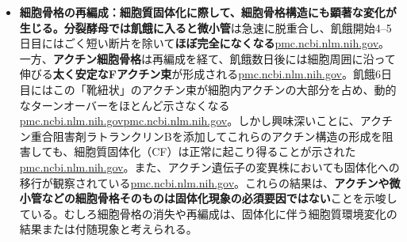 \begin{itemize}
    \item \textbf{細胞骨格の再編成：\textbf{細胞質固体化に際して、細胞骨格構造にも顕著な変化が生じる。分裂酵母では飢餓に入ると}微小管}は急速に脱重合し、飢餓開始4–5日目にはごく短い断片を除いて\textbf{ほぼ完全になくなる}\href{https://pmc.ncbi.nlm.nih.gov/articles/PMC6857596/\#:~:text=Microtubules\%20can\%20be\%20virtually\%20excluded\%2C,confirmed\%20this\%20result\%20by\%20imaging}{pmc.ncbi.nlm.nih.gov}。一方、\textbf{アクチン細胞骨格}は再編成を経て、飢餓数日後には細胞周囲に沿って伸びる\textbf{太く安定なFアクチン束}が形成される\href{https://pmc.ncbi.nlm.nih.gov/articles/PMC6857596/\#:~:text=curled\%20around\%20the\%20cell\%20ends,circumference\%2C\%20while\%20curling\%20around\%20both}{pmc.ncbi.nlm.nih.gov}。飢餓6日目にはこの「靴紐状」のアクチン束が細胞内アクチンの大部分を占め、動的なターンオーバーをほとんど示さなくなる\href{https://pmc.ncbi.nlm.nih.gov/articles/PMC6857596/\#:~:text=curled\%20around\%20the\%20cell\%20ends,circumference\%2C\%20while\%20curling\%20around\%20both}{pmc.ncbi.nlm.nih.gov}\href{https://pmc.ncbi.nlm.nih.gov/articles/PMC6857596/\#:~:text=SD6\%20did\%20not\%20affect\%20the,on\%20SD3\%29\%20and}{pmc.ncbi.nlm.nih.gov}。しかし興味深いことに、アクチン重合阻害剤ラトランクリンBを添加してこれらのアクチン構造の形成を阻害しても、細胞質固体化（CF）は正常に起こり得ることが示された\href{https://pmc.ncbi.nlm.nih.gov/articles/PMC6857596/\#:~:text=and\%20Methods\%29,experiment\%2C\%20LatB\%20significantly\%20interferes\%20with}{pmc.ncbi.nlm.nih.gov}。また、アクチン遺伝子の変異株においても固体化への移行が観察されている\href{https://pmc.ncbi.nlm.nih.gov/articles/PMC6857596/\#:~:text=and\%20Methods\%29,experiment\%2C\%20LatB\%20significantly\%20interferes\%20with}{pmc.ncbi.nlm.nih.gov}。これらの結果は、\textbf{アクチンや微小管などの細胞骨格そのものは固体化現象の必須要因ではない}ことを示唆している。むしろ細胞骨格の消失や再編成は、固体化に伴う細胞質環境変化の結果または付随現象と考えられる。

\end{itemize}
